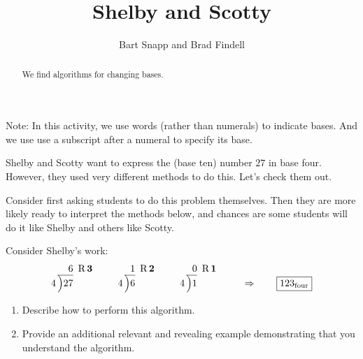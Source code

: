 \documentclass{ximera}
\title{Shelby and Scotty}
\author{Bart Snapp and Brad Findell}
\begin{document}
\begin{abstract}
We find algorithms for changing bases.
\end{abstract}
\maketitle

\label{A:SS}

Note: In this activity, we use words (rather than numerals) to indicate bases.  
And we use use a subscript after a numeral to specify its base.  

Shelby and Scotty want to express the (base ten) number $27$ in base
four. However, they used very different methods to do this. Let's check
them out.

\begin{teachingnote}
Consider first asking students to do this problem themselves.  Then they are more likely ready to interpret the methods below, and chances are some students will do it like Shelby and others like Scotty. 
\end{teachingnote}

\begin{problem} Consider Shelby's work:
\[
4\,\begin{tabular}[b]{@{}r@{} r}
$6$ &\, R\,$\boldsymbol{3}$\\ \cline{1-1}
\Big)\begin{tabular}[t]{@{}l@{}}
$27$ 
\end{tabular}
\end{tabular}
\qquad
4\,\begin{tabular}[b]{@{}r@{} r}
$1$ &\, R\,$\boldsymbol{2}$\\ \cline{1-1}
\Big)\begin{tabular}[t]{@{}l@{}}
$6$ 
\end{tabular}
\end{tabular}
\qquad
4\,\begin{tabular}[b]{@{}r@{} r}
$0$ &\, R\,$\boldsymbol{1}$\\ \cline{1-1}
\Big)\begin{tabular}[t]{@{}l@{}}
$1$ 
\end{tabular}
\end{tabular} \qquad \Rightarrow \qquad \fbox{$123_\textrm{four}$}
\]
\begin{enumerate}
\item Describe how to perform this algorithm.
\item Provide an additional relevant and revealing example
  demonstrating that you understand the algorithm.
\end{enumerate}
\end{problem}
\end{document}

